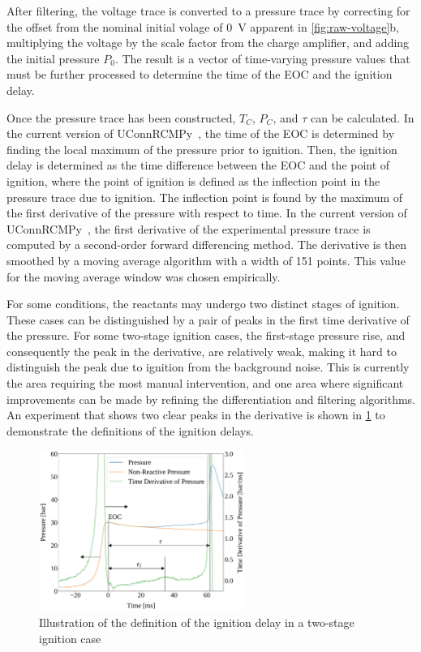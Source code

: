 \documentclass[12pt]{../ussci}
\begin{document}
After filtering, the voltage trace is converted to a pressure trace by
correcting for the offset from the nominal initial volage of \SI{0}{\V} apparent
in \mbox{\cref{fig:raw-voltage}b}, multiplying the voltage by the scale factor
from the charge amplifier, and adding the initial pressure \(P_0\). The result
is a vector of time-varying pressure values that must be further processed to
determine the time of the EOC and the ignition delay.

Once the pressure trace has been constructed, \(T_C\), \(P_C\), and \(\tau\) can
be calculated. In the current version of UConnRCMPy~\autocite{uconnrcmpy}, the
time of the EOC is determined by finding the local maximum of the pressure prior
to ignition. Then, the ignition delay is determined as the time difference
between the EOC and the point of ignition, where the point of ignition is
defined as the inflection point in the pressure trace due to ignition. The
inflection point is found by the maximum of the first derivative of the pressure
with respect to time. In the current version of
UConnRCMPy~\autocite{uconnrcmpy}, the first derivative of the experimental
pressure trace is computed by a second-order forward differencing method. The
derivative is then smoothed by a moving average algorithm with a width of 151
points. This value for the moving average window was chosen empirically.

For some conditions, the reactants may undergo two distinct stages of ignition.
These cases can be distinguished by a pair of peaks in the first time derivative
of the pressure. For some two-stage ignition cases, the first-stage pressure
rise, and consequently the peak in the derivative, are relatively weak, making
it hard to distinguish the peak due to ignition from the background noise. This
is currently the area requiring the most manual intervention, and one area where
significant improvements can be made by refining the differentiation and
filtering algorithms. An experiment that shows two clear peaks in the derivative
is shown in \cref{fig:ign-delay-def} to demonstrate the definitions of the
ignition delays.

\begin{figure}[htbp]
    \centering
    \includegraphics[width=0.6\textwidth]{figures/ign-delay-def.pdf}
    \caption{Illustration of the definition of the ignition delay in a
    two-stage ignition case}
    \label{fig:ign-delay-def}
\end{figure}
\end{document}
